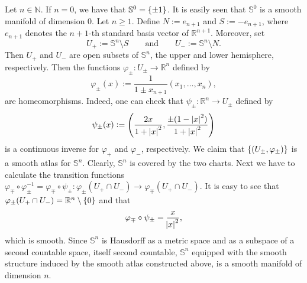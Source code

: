 \begin{example}[$n$-Spheres]
	Let $n \in \mathbb{N}$. If $n = 0$, we have that $\mathbb{S}^0 = \cbr{\pm 1}$. It is easily seen that $\mathbb{S}^0$ is a smooth manifold of dimension $0$. Let $n \geq 1$. Define $N := e_{n + 1}$ and $S := -e_{n + 1}$, where $e_{n + 1}$ denotes the $n + 1$-th standard basis vector of $\mathbb{R}^{n + 1}$. Moreover, set
	\begin{equation*}
		U_+ := \mathbb{S}^n \setminus S \qquad \text{and} \qquad U_- := \mathbb{S}^n \setminus N.
	\end{equation*}
	Then $U_+$ and $U_-$ are open subsets of $\mathbb{S}^n$, the upper and lower hemisphere, respectively. Then the functions $\varphi_\pm : U_\pm \to \mathbb{R}^n$ defined by
	\begin{equation*}
		\varphi_\pm(x) := \frac{1}{1 \pm x_{n + 1}}(x_1,\dots,x_n),
	\end{equation*}
	\noindent are homeomorphisms. Indeed, one can check that $\psi_\pm : \mathbb{R}^n \to U_\pm$ defined by
	\begin{equation*}
		\psi_\pm(x) := \del[4]{\frac{2x}{1 + \abs[0]{x}^2}, \frac{\pm(1 - \abs[0]{x}^2)}{1 + \abs[0]{x}^2}} 
	\end{equation*}
	\noindent is a continuous inverse for $\varphi_+$ and $\varphi_-$, respectively. We claim that $\cbr[0]{(U_\pm,\varphi_\pm)}$ is a smooth atlas for $\mathbb{S}^n$. Clearly, $\mathbb{S}^n$ is covered by the two charts. Next we have to calculate the transition functions $\varphi_\mp \circ \varphi^{-1}_\pm = \varphi_\mp \circ \psi_\pm : \varphi_\pm(U_+ \cap U_-) \to \varphi_\mp(U_+ \cap U_-)$. It is easy to see that $\varphi_\pm(U_+ \cap U_-) = \mathbb{R}^n \setminus \cbr{0}$ and that
	\begin{equation*}
		\varphi_\mp \circ \psi_\pm = \frac{x}{\abs{x}^2},
	\end{equation*}
	\noindent which is smooth. Since $\mathbb{S}^n$ is Hausdorff as a metric space and as a subspace of a second countable space, itself second countable, $\mathbb{S}^n$ equipped with the smooth structure induced by the smooth atlas constructed above, is a smooth manifold of dimension $n$.
\end{example}

